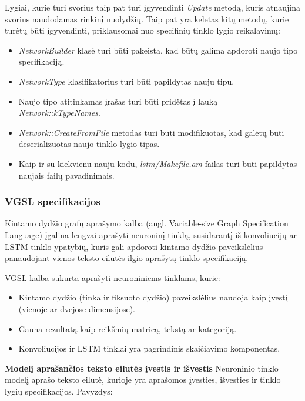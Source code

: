 \documentclass{VUMIFInfBakalaurinis}
\begin{document}
Lygiai, kurie turi svorius taip pat turi įgyvendinti \textit{Update} metodą, kuris atnaujina svorius naudodamas rinkinį nuolydžių.
Taip pat yra keletas kitų metodų, kurie turėtų būti įgyvendinti, priklausomai nuo specifinių tinklo lygio reikalavimų:

\begin{itemize}
  \item \textit{NetworkBuilder} klasė turi būti pakeista, kad būtų galima apdoroti naujo tipo specifikaciją.
  \item \textit{NetworkType} klasifikatorius turi būti papildytas nauju tipu.
  \item Naujo tipo atitinkamas įrašas turi būti pridėtas į lauką \textit{Network::kTypeNames}.
  \item \textit{Network::CreateFromFile} metodas turi būti modifikuotas, kad galėtų būti deserializuotas naujo tinklo lygio tipas.
  \item Kaip ir su kiekvienu nauju kodu, \textit{lstm/Makefile.am} failas turi būti papildytas naujais failų pavadinimais. 
\end{itemize}

\subsubsection{VGSL specifikacijos}
Kintamo dydžio grafų aprašymo kalba (angl. Variable-size Graph Specification Language) įgalina lengvai aprašyti neuroninį tinklą, 
susidarantį iš konvoliucijų ar LSTM tinklo ypatybių, kuris gali apdoroti kintamo dydžio paveikslėlius panaudojant vienos teksto eilutės ilgio aprašytą tinklo specifikaciją.

VGSL kalba sukurta aprašyti neuroniniems tinklams, kurie:

\begin{itemize}
  \item Kintamo dydžio (tinka ir fiksuoto dydžio) paveikslėlius naudoja kaip įvestį (vienoje ar dvejose dimensijose).
  \item Gauna rezultatą kaip reikšmių matricą, tekstą ar kategoriją.
  \item Konvoliucijos ir LSTM tinklai yra pagrindinis skaičiavimo komponentas.
\end{itemize}

\textbf{Modelį aprašančios teksto eilutės įvestis ir išvestis}
Neuroninio tinklo modelį aprašo teksto eilutė, kurioje yra aprašomos įvesties, išvesties ir tinklo lygių specifikacijos. 
Pavyzdys: 
\end{document}
